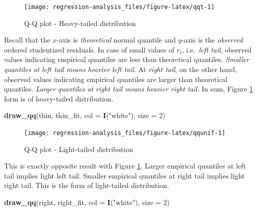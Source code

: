 \documentclass[]{book}
\newenvironment{Shaded}{\begin{snugshade}}{\end{snugshade}}
\newcommand{\DataTypeTok}[1]{\textcolor[rgb]{0.13,0.29,0.53}{#1}}
\newcommand{\DecValTok}[1]{\textcolor[rgb]{0.00,0.00,0.81}{#1}}
\newcommand{\KeywordTok}[1]{\textcolor[rgb]{0.13,0.29,0.53}{\textbf{#1}}}
\newcommand{\NormalTok}[1]{#1}
\newcommand{\StringTok}[1]{\textcolor[rgb]{0.31,0.60,0.02}{#1}}
\theoremstyle{definition}
\theoremstyle{definition}
\theoremstyle{definition}
\theoremstyle{remark}
\begin{document}
\begin{figure}[H]

{\centering \texttt{[image: regression-analysis\_files/figure-latex/qqt-1]} 

}

\caption{Q-Q plot - Heavy-tailed distribution}\label{fig:qqt}
\end{figure}

Recall that the \(x\)-axis is \emph{theoretical} normal quantile and \(y\)-axis is the \emph{observed} ordered studentized residuals. In case of small values of \(r_i\), i.e.~\emph{left tail}, observed values indicating empirical quantiles are less than theoretical quantiles. \emph{Smaller quantiles at left tail means heavier left tail}. At \emph{right tail}, on the other hand, observed values indicating empirical quantiles are larger than theoretical quantiles. \emph{Larger quantiles at right tail means heavier right tail}. In sum, Figure \ref{fig:qqt} form is of heavy-tailed distribution.

\begin{Shaded}
\begin{Highlighting}[]
\KeywordTok{draw_qq}\NormalTok{(thin, thin_fit, }\DataTypeTok{col =} \KeywordTok{I}\NormalTok{(}\StringTok{"white"}\NormalTok{), }\DataTypeTok{size =} \DecValTok{2}\NormalTok{)}
\end{Highlighting}
\end{Shaded}

\begin{figure}[H]

{\centering \texttt{[image: regression-analysis\_files/figure-latex/qqunif-1]} 

}

\caption{Q-Q plot - Light-tailed distribution}\label{fig:qqunif}
\end{figure}

This is exactly opposite result with Figure \ref{fig:qqt}. Larger empirical quantiles at left tail implies light left tail. Smaller empirical quantiles at right tail implies light right tail. This is the form of light-tailed distribution.

\begin{Shaded}
\begin{Highlighting}[]
\KeywordTok{draw_qq}\NormalTok{(right, right_fit, }\DataTypeTok{col =} \KeywordTok{I}\NormalTok{(}\StringTok{"white"}\NormalTok{), }\DataTypeTok{size =} \DecValTok{2}\NormalTok{)}
\end{Highlighting}
\end{Shaded}
\end{document}
